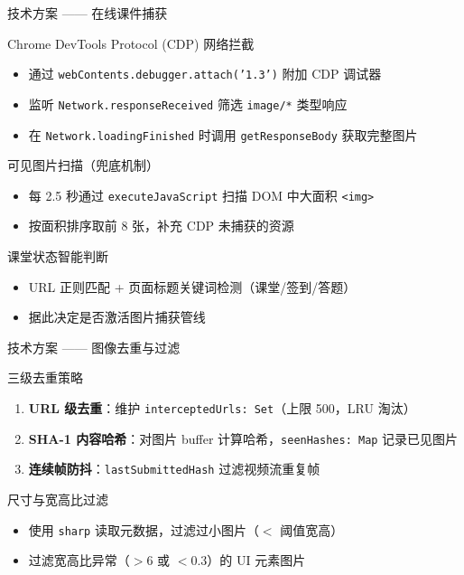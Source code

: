 \documentclass[aspectratio=169]{beamer}
\begin{document}
\begin{frame}{技术方案 —— 在线课件捕获}
  \begin{block}{Chrome DevTools Protocol (CDP) 网络拦截}
    \begin{itemize}
      \item 通过 \texttt{webContents.debugger.attach('1.3')} 附加 CDP 调试器
      \item 监听 \texttt{Network.responseReceived} 筛选 \texttt{image/*} 类型响应
      \item 在 \texttt{Network.loadingFinished} 时调用 \texttt{getResponseBody} 获取完整图片
    \end{itemize}
  \end{block}

  \begin{block}{可见图片扫描（兜底机制）}
    \begin{itemize}
      \item 每 2.5 秒通过 \texttt{executeJavaScript} 扫描 DOM 中大面积 \texttt{<img>}
      \item 按面积排序取前 8 张，补充 CDP 未捕获的资源
    \end{itemize}
  \end{block}

  \begin{block}{课堂状态智能判断}
    \begin{itemize}
      \item URL 正则匹配 + 页面标题关键词检测（课堂/签到/答题）
      \item 据此决定是否激活图片捕获管线
    \end{itemize}
  \end{block}
\end{frame}

\begin{frame}{技术方案 —— 图像去重与过滤}
  \begin{block}{三级去重策略}
    \begin{enumerate}
      \item \textbf{URL 级去重}：维护 \texttt{interceptedUrls: Set}（上限 500，LRU 淘汰）
      \item \textbf{SHA-1 内容哈希}：对图片 buffer 计算哈希，\texttt{seenHashes: Map} 记录已见图片
      \item \textbf{连续帧防抖}：\texttt{lastSubmittedHash} 过滤视频流重复帧
    \end{enumerate}
  \end{block}

  \begin{block}{尺寸与宽高比过滤}
    \begin{itemize}
      \item 使用 \texttt{sharp} 读取元数据，过滤过小图片（$<$ 阈值宽高）
      \item 过滤宽高比异常（$>6$ 或 $<0.3$）的 UI 元素图片
    \end{itemize}
  \end{block}
\end{frame}
\end{document}
